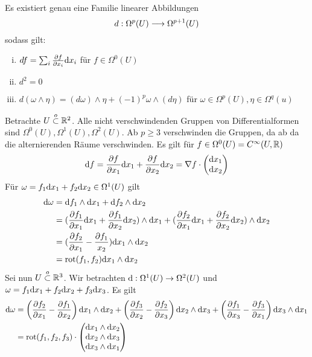 Es existiert genau eine Familie linearer Abbildungen
\[ d : \Omega^p(U) \overset{}{\longrightarrow} \Omega^{p+1}(U) \]
sodass gilt:
\begin{enumerate}[(i)]
	\item $d f= \sum_{i} \frac{\partial f}{\partial x_i} \text{d} x_i$ für $f \in \Omega^0(U)$
	\item $d^2 = 0$
	\item $d(\omega\wedge \eta) = (d \omega) \wedge \eta + (-1)^p\omega \wedge (d\eta)$ für $\omega \in \Omega^p(U), \eta \in \Omega^q(u)$
\end{enumerate}

Betrachte $U \overset{o}{\subset} \mathbb{R}^2$. Alle nicht verschwindenden Gruppen von Differentialformen sind $\Omega^0(U),\Omega^1(U),\Omega^2(U)$. Ab $p\geq 3$ verschwinden die Gruppen, da ab da die alternierenden Räume verschwinden. Es gilt für $f \in \Omega^0(U) = C^\infty(U,\mathbb{R})$
\[ \text{d} f = \frac{\partial f}{\partial x_1} \text{d} x_1 +  \frac{\partial f}{\partial x_2} \text{d} x_2 = \nabla f \cdot 
\left(
\begin{matrix}
\text{d} x_1\\
\text{d} x_2
\end{matrix}
\right) \]
Für $\omega = f_1 \text{d} x_1 + f_2 \text{d} x_2 \in \Omega^1(U)$ gilt
\begin{align*}
\text{d} \omega &= \text{d} f_1 \wedge \text{d} x_1 + \text{d} f_2 \wedge \text{d} x_2\\
&= (\frac{\partial f_1}{\partial x_1} \text{d} x_1 + \frac{\partial f_1}{\partial x_2} \text{d} x_2)\wedge \text{d} x_1
+(\frac{\partial f_2}{\partial x_1} \text{d} x_1 + \frac{\partial f_2}{\partial x_2} \text{d} x_2)\wedge \text{d} x_2\\
&= (\frac{\partial f_2}{\partial x_1} - \frac{\partial f_1}{x_2}) \text{d} x_1 \wedge \text{d} x_2\\
&= \text{rot}(f_1, f_2) \text{d} x_1 \wedge \text{d} x_2
\end{align*}
Sei nun $U \overset{o}{\subset} \mathbb{R}^3$. Wir betrachten $\text{d} : \Omega^1(U) \overset{}{\rightarrow} \Omega^2(U)$ und $\omega = f_1 \text{d} x_1 + f_2 \text{d} x_2 + f_3 \text{d} x_3$. Es gilt
\begin{align*}
\text{d} \omega &= \left(\frac{\partial f_2}{\partial x_1} -\frac{\partial f_1}{\partial x_2}\right)  \text{d} x_1 \wedge \text{d} x_2
+\left(\frac{\partial f_3}{\partial x_2} -\frac{\partial f_2}{\partial x_3}\right)  \text{d} x_2 \wedge \text{d} x_3
+\left(\frac{\partial f_1}{\partial x_3} -\frac{\partial f_3}{\partial x_1}\right)  \text{d} x_3 \wedge \text{d} x_1\\
&= \text{rot}(f_1, f_2, f_3) \cdot
\left(\begin{matrix}
	\text{d} x_1 \wedge \text{d} x_2\\
	\text{d} x_2 \wedge \text{d} x_3\\
	\text{d} x_3 \wedge \text{d} x_1
	\end{matrix}\right)
\end{align*}
